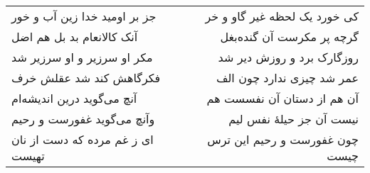 \begin{center}
\begin{longtable}{l p{0.5cm} r}
\\
جز بر اومید خدا زین آب و خور
&&
کی خورد یک لحظه غیر گاو و خر
\\
آنک کالانعام بد بل هم اضل
&&
گرچه پر مکرست آن گنده‌بغل
\\
مکر او سرزیر و او سرزیر شد
&&
روزگارک برد و روزش دیر شد
\\
فکرگاهش کند شد عقلش خرف
&&
عمر شد چیزی ندارد چون الف
\\
آنچ می‌گوید درین اندیشه‌ام
&&
آن هم از دستان آن نفسست هم
\\
وآنچ می‌گوید غفورست و رحیم
&&
نیست آن جز حیلهٔ نفس لیم
\\
ای ز غم مرده که دست از نان تهیست
&&
چون غفورست و رحیم این ترس چیست
\\
\end{longtable}
\end{center}
